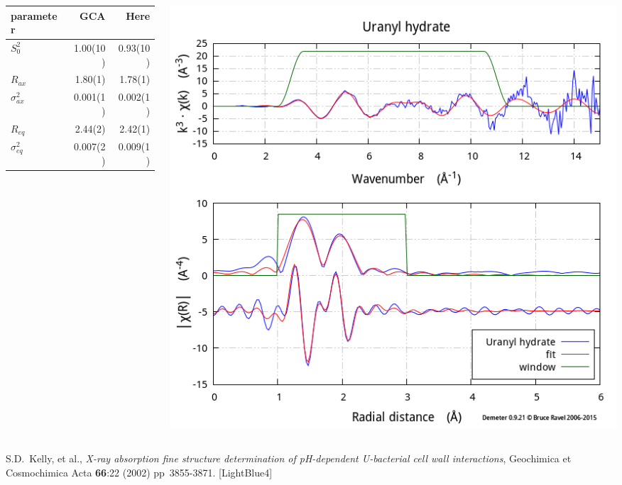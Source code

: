 \documentclass[10pt, xcolor=x11names, compress]{beamer}
\begin{document}
\begin{frame}
\begin{columns}[T]
\begin{column}{0.5\linewidth}
      \begin{tabular}{lrr}
        \small parameter & GCA & Here \\
        \hline
        $S_0^2$         &   1.00(10) & 0.93(10) \\
        $R_{ax}$        &  1.80(1) & 1.78(1) \\
        $\sigma^2_{ax}$ &  0.001(1) & 0.002(1) \\
        $R_{eq}$        &  2.44(2) & 2.42(1) \\
        $\sigma^2_{eq}$ &  0.007(2) & 0.009(1) \\
      \end{tabular}
    \end{column}
    \begin{column}{0.5\linewidth}
      \includegraphics[width=0.85\linewidth]{images/fit.png}
    \end{column}
  \end{columns}
  \begin{bottomnote}[0.7][19.0]
    S.D.\ Kelly, et al., \textit{X-ray absorption fine structure
      determination of pH-dependent U-bacterial cell wall
      interactions}, Geochimica et Cosmochimica Acta \textbf{66}:22
    (2002) pp\  3855-3871.
    [LightBlue4]
  \end{bottomnote}
\end{frame}
\end{document}
